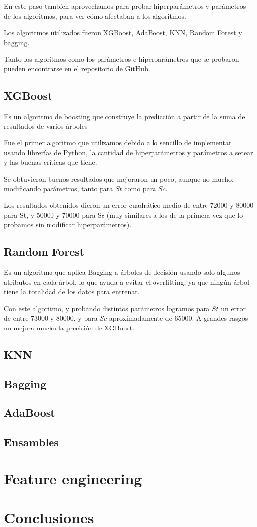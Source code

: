 \documentclass{article}
\begin{document}
En este paso tambíen aprovechamos para probar hiperparámetros y parámetros de los algoritmos, para ver cómo afectaban a los algoritmos.

Los algoritmos utilizados fueron XGBoost, AdaBoost, KNN, Random Forest y bagging.

Tanto los algoritmos como los parámetros e hiperparámetros que se probaron pueden encontrarse en el repositorio de GitHub.

\subsection{XGBoost}
Es un algoritmo de boosting que construye la predicción a partir de la suma de resultados de varios árboles

Fue el primer algoritmo que utilizamos debido a lo sencillo de implementar usando librerías de Python, la cantidad de hiperparámetros y parámetros a setear y las buenas críticas que tiene.

Se obtuvieron buenos resultados que mejoraron un poco, aunque no mucho, modificando parámetros, tanto para $St$ como para $Sc$.

Los resultados obtenidos dieron un error cuadrático medio de entre 72000 y 80000 para St, y 50000 y 70000 para Sc (muy similares a los de la primera vez que lo probamos sin modificar hiperparámetros).

\subsection{Random Forest}
Es un algoritmo que aplica Bagging a árboles de decisión usando solo algunos atributos en cada árbol, lo que ayuda a evitar el overfitting, ya que ningún árbol tiene la totalidad de los datos para entrenar.

Con este algoritmo, y probando distintos parámetros logramos para $St$ un error de entre 73000 y 80000, y para $Sc$ aproximadamente de 65000. A grandes rasgos no mejora mucho la precisión de XGBoost.

\subsection{KNN}

\subsection{Bagging}
\subsection{AdaBoost}

\subsection{Ensambles}

\newpage
\section{Feature engineering}




\section{Conclusiones}
\end{document}
